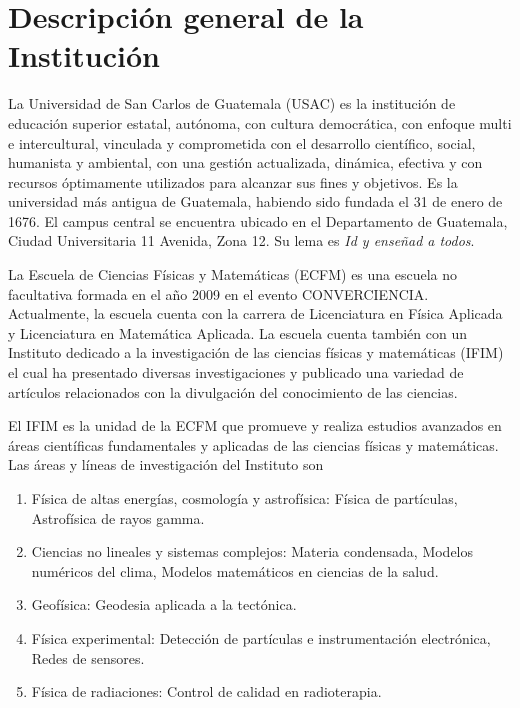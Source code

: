 \documentclass[titlepage,11pt]{article}
\begin{document}
\newpage
\pagestyle{plain}
\tableofcontents
\newpage


\section{Descripción general de la Institución}
\label{sec:institucion}
La Universidad de San Carlos de Guatemala (USAC) es la institución de
educación superior estatal, autónoma, con cultura democrática, con enfoque
multi e intercultural, vinculada y comprometida con el desarrollo científico,
social, humanista y ambiental, con una gestión actualizada, dinámica, efectiva
y con recursos óptimamente utilizados para alcanzar sus fines y objetivos. Es
la universidad más antigua de Guatemala, habiendo sido fundada el 31 de enero
de 1676. El campus central se encuentra ubicado en el Departamento de
Guatemala, Ciudad Universitaria 11 Avenida, Zona 12. Su lema es \emph{Id y
  enseñad a todos}.

La Escuela de Ciencias Físicas y Matemáticas (ECFM) es una escuela no
facultativa formada en el año 2009 en el evento CONVERCIENCIA. Actualmente, la
escuela cuenta con la carrera de Licenciatura en Física Aplicada y
Licenciatura en Matemática Aplicada. La escuela cuenta también con un
Instituto dedicado a la investigación de las ciencias físicas y matemáticas
(IFIM) el cual ha presentado diversas investigaciones y publicado una variedad
de artículos relacionados con la divulgación del conocimiento de las ciencias.

El IFIM es la unidad de la ECFM que promueve y realiza estudios avanzados en
áreas científicas fundamentales y aplicadas de las ciencias físicas y
matemáticas.  Las áreas y líneas de investigación del Instituto son
\begin{enumerate}
\item Física de altas energías, cosmología y astrofísica: Física de
  partículas, Astrofísica de rayos gamma.
\item Ciencias no lineales y sistemas complejos: Materia condensada, Modelos
  numéricos del clima, Modelos matemáticos en ciencias de la salud.
\item Geofísica: Geodesia aplicada a la tectónica.
\item Física experimental: Detección de partículas e instrumentación
  electrónica, Redes de sensores.
\item Física de radiaciones: Control de calidad en radioterapia.
\end{enumerate}
\end{document}
